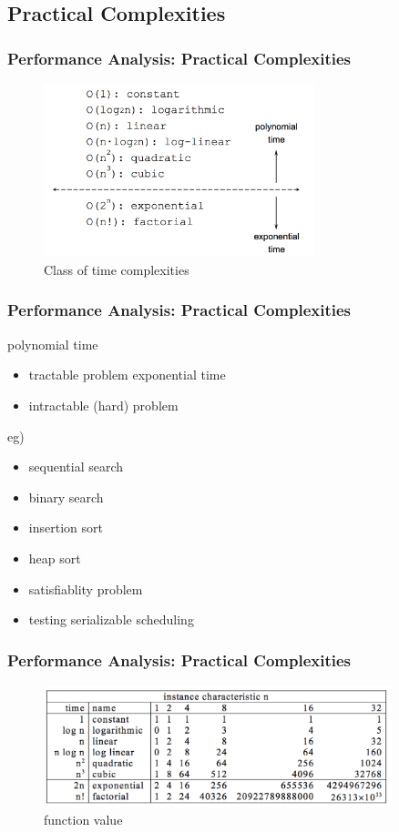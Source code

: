 \documentclass[newPxFont,sthlmFooter,nooffset]{beamer}
\begin{document}
\subsection{Practical Complexities}
\begin{frame}[t]
  \frametitle{Performance Analysis: Practical Complexities}

  \begin{figure}[h]
    \centering
    \includegraphics[width=0.7\textwidth]{figures/fig08_class.png}
    \caption{Class of time complexities}
  \end{figure}
\end{frame}


\begin{frame}[t]
  \frametitle{Performance Analysis: Practical Complexities}
polynomial time
\begin{itemize}
\item tractable problem exponential time
\item intractable (hard) problem
\end{itemize}

eg)
\begin{itemize}
\item  sequential search
\item binary search
\item insertion sort
\item heap sort
\item satisfiablity problem
\item testing serializable scheduling
\end{itemize}

\end{frame}



\begin{frame}[t]
  \frametitle{Performance Analysis: Practical Complexities}

  \begin{figure}[h]
    \centering
    \includegraphics[width=0.9\textwidth]{figures/fig09_func.png}
    \caption{function value}
  \end{figure}
\end{frame}
\end{document}
